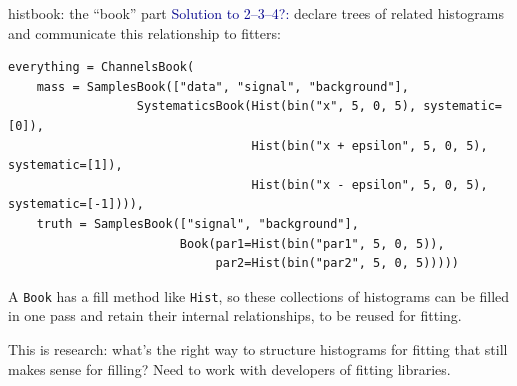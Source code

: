 \documentclass[aspectratio=169]{beamer}
\begin{document}
\begin{frame}[fragile]{histbook: the ``book'' part}
\vspace{0.25 cm}
\textcolor{darkblue}{Solution to 2--3--4?:} declare trees of related histograms and communicate this relationship to fitters:

\scriptsize
\begin{verbatim}
everything = ChannelsBook(
    mass = SamplesBook(["data", "signal", "background"],
                  SystematicsBook(Hist(bin("x", 5, 0, 5), systematic=[0]),
                                  Hist(bin("x + epsilon", 5, 0, 5), systematic=[1]),
                                  Hist(bin("x - epsilon", 5, 0, 5), systematic=[-1]))),
    truth = SamplesBook(["signal", "background"],
                        Book(par1=Hist(bin("par1", 5, 0, 5)),
                             par2=Hist(bin("par2", 5, 0, 5)))))
\end{verbatim}

\normalsize
\vspace{0.5 cm}
A {\tt\small Book} has a fill method like {\tt\small Hist}, so these collections of histograms can be filled in one pass and retain their internal relationships, to be reused for fitting.

\vspace{0.5 cm}
This is research: what's the right way to structure histograms for fitting that still makes sense for filling? Need to work with developers of fitting libraries.
\end{frame}
\end{document}

